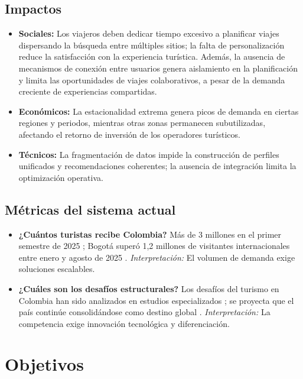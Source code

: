 \documentclass[12pt, letterpaper]{article}
\begin{document}
\subsection{Impactos}

\begin{itemize}
\item \textbf{Sociales:} Los viajeros deben dedicar tiempo excesivo a planificar viajes dispersando la búsqueda entre múltiples sitios; la falta de personalización reduce la satisfacción con la experiencia turística. Además, la ausencia de mecanismos de conexión entre usuarios genera aislamiento en la planificación y limita las oportunidades de viajes colaborativos, a pesar de la demanda creciente de experiencias compartidas.
\item \textbf{Económicos:} La estacionalidad extrema genera picos de demanda en ciertas regiones y periodos, mientras otras zonas permanecen subutilizadas, afectando el retorno de inversión de los operadores turísticos.
\item \textbf{Técnicos:} La fragmentación de datos impide la construcción de perfiles unificados y recomendaciones coherentes; la ausencia de integración limita la optimización operativa.
\end{itemize}

\subsection{Métricas del sistema actual}

\begin{itemize}
\item \textbf{¿Cuántos turistas recibe Colombia?} Más de 3 millones en el primer semestre de 2025 \citep{ref6}; Bogotá superó 1,2 millones de visitantes internacionales entre enero y agosto de 2025 \citep{ref7}. \textit{Interpretación:} El volumen de demanda exige soluciones escalables.
\item \textbf{¿Cuáles son los desafíos estructurales?} Los desafíos del turismo en Colombia han sido analizados en estudios especializados \citep{ref8}; se proyecta que el país continúe consolidándose como destino global \citep{ref9}. \textit{Interpretación:} La competencia exige innovación tecnológica y diferenciación.
\end{itemize}

\section{Objetivos}
\end{document}
